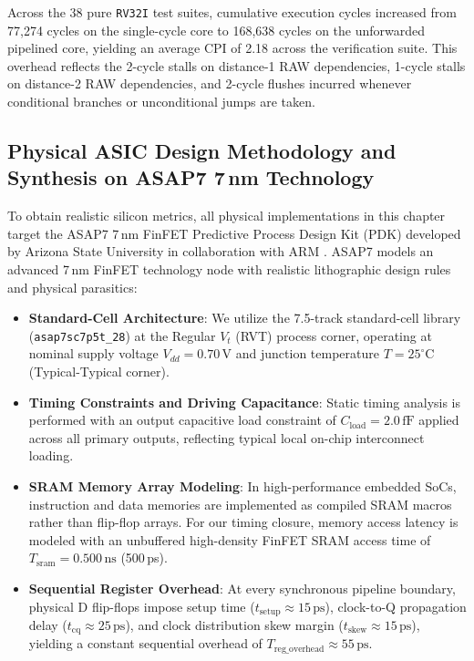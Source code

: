 Across the 38 pure \texttt{RV32I} test suites, cumulative execution cycles increased from 77,274 cycles on the single-cycle core to 168,638 cycles on the unforwarded pipelined core, yielding an average CPI of 2.18 across the verification suite. This overhead reflects the 2-cycle stalls on distance-1 RAW dependencies, 1-cycle stalls on distance-2 RAW dependencies, and 2-cycle flushes incurred whenever conditional branches or unconditional jumps are taken.

\subsection{Physical ASIC Design Methodology and Synthesis on ASAP7 7\,nm Technology}

To obtain realistic silicon metrics, all physical implementations in this chapter target the ASAP7 7\,nm FinFET Predictive Process Design Kit (PDK) developed by Arizona State University in collaboration with ARM \cite{clark2016asap7}. ASAP7 models an advanced 7\,nm FinFET technology node with realistic lithographic design rules and physical parasitics:
\begin{itemize}
    \item \textbf{Standard-Cell Architecture}: We utilize the 7.5-track standard-cell library (\texttt{asap7sc7p5t\_28}) at the Regular $V_t$ (RVT) process corner, operating at nominal supply voltage $V_{dd} = 0.70\,\text{V}$ and junction temperature $T = 25^\circ\text{C}$ (Typical-Typical corner).
    \item \textbf{Timing Constraints and Driving Capacitance}: Static timing analysis is performed with an output capacitive load constraint of $C_{\text{load}} = 2.0\,\text{fF}$ applied across all primary outputs, reflecting typical local on-chip interconnect loading.
    \item \textbf{SRAM Memory Array Modeling}: In high-performance embedded SoCs, instruction and data memories are implemented as compiled SRAM macros rather than flip-flop arrays. For our timing closure, memory access latency is modeled with an unbuffered high-density FinFET SRAM access time of $T_{\text{sram}} = 0.500\,\text{ns}$ (500\,ps).
    \item \textbf{Sequential Register Overhead}: At every synchronous pipeline boundary, physical D flip-flops impose setup time ($t_{\text{setup}} \approx 15\,\text{ps}$), clock-to-Q propagation delay ($t_{\text{cq}} \approx 25\,\text{ps}$), and clock distribution skew margin ($t_{\text{skew}} \approx 15\,\text{ps}$), yielding a constant sequential overhead of $T_{\text{reg\_overhead}} \approx 55\,\text{ps}$.
\end{itemize}

